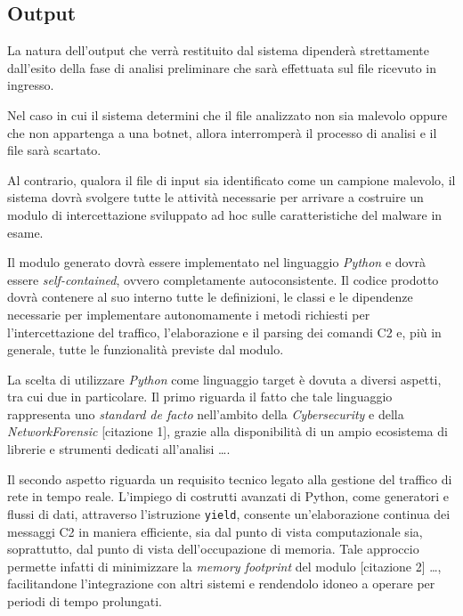 \subsection{Output} %

La natura dell'output che verrà restituito dal sistema dipenderà strettamente dall'esito della fase di analisi preliminare che sarà effettuata sul file ricevuto in ingresso.

Nel caso in cui il sistema determini che il file analizzato non sia malevolo oppure che non appartenga a una botnet, allora interromperà il processo di analisi e il file sarà scartato.

Al contrario, qualora il file di input sia identificato come un campione malevolo, il sistema dovrà svolgere tutte le attività necessarie per arrivare a costruire un modulo di intercettazione sviluppato ad hoc sulle caratteristiche del malware in esame.

Il modulo generato dovrà essere implementato nel linguaggio \textit{Python} e dovrà essere \textit{self-contained}, ovvero completamente autoconsistente. Il codice prodotto dovrà contenere al suo interno tutte le definizioni, le classi e le dipendenze necessarie per implementare autonomamente i metodi richiesti per l'intercettazione del traffico, l'elaborazione e il parsing dei comandi C2 e, più in generale, tutte le funzionalità previste dal modulo.

La scelta di utilizzare \textit{Python} come linguaggio target è dovuta a diversi aspetti, tra cui due in particolare. Il primo riguarda il fatto che tale linguaggio rappresenta uno \textit{standard de facto} nell'ambito della \textit{Cybersecurity} e della \textit{NetworkForensic} \cite{sans2020taxonomy} [citazione 1], grazie alla disponibilità di un ampio ecosistema di librerie e strumenti dedicati all'analisi \dots.

Il secondo aspetto riguarda un requisito tecnico legato alla gestione del traffico di rete in tempo reale. L'impiego di costrutti avanzati di Python, come generatori e flussi di dati, attraverso l'istruzione \texttt{yield}, consente un'elaborazione continua dei messaggi C2 in maniera efficiente, sia dal punto di vista computazionale sia, soprattutto, dal punto di vista dell'occupazione di memoria. Tale approccio permette infatti di minimizzare la \textit{memory footprint} del modulo \cite{sans2020taxonomy} [citazione 2] \dots, facilitandone l'integrazione con altri sistemi e rendendolo idoneo a operare per periodi di tempo prolungati.

